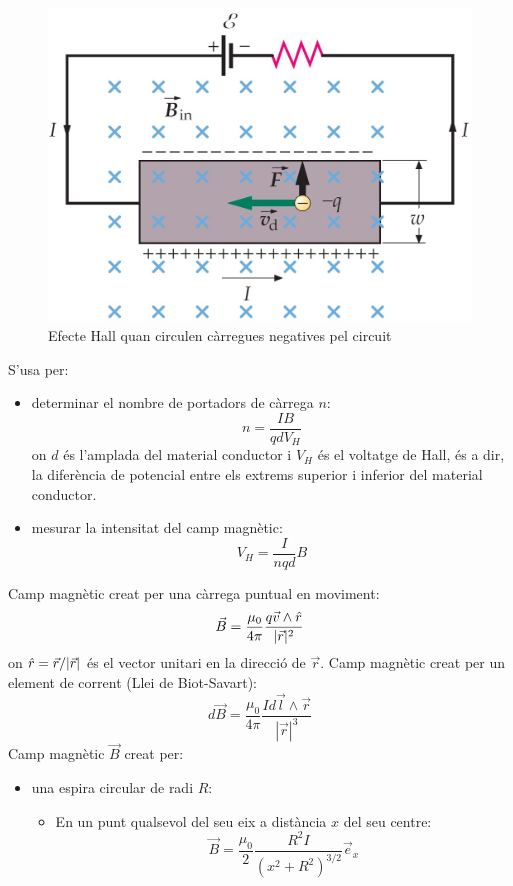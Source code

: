 \documentclass[class=article,10pt,crop=false]{standalone}
\begin{document}
\begin{multicols}{2}
\begin{figure}[ht]
\end{figure}
\begin{figure}[ht]
    \centering
    \includegraphics[width=\linewidth]{Physics/1st/Electricitat_i_magnetisme/Imatges/hall-.jpg} 
    \caption{Efecte Hall quan circulen càrregues negatives pel circuit}   
\end{figure}
S'usa per:
\begin{itemize}
    \item determinar el nombre de portadors de càrrega $n$: $$n=\frac{IB}{qdV_H}$$ {on $d$ és l'amplada del material conductor i $V_H$ és el voltatge de Hall, és a dir, la di\-fe\-rèn\-ci\-a de potencial entre els extrems superior i inferior del material conductor.}
    \item mesurar la intensitat del camp mag\-nè\-tic: $$V_H=\frac{I}{nqd}B$$
\end{itemize}
Camp magnètic creat per una càrrega puntual en moviment: $$\Vec{B}=\frac{\mu_0}{4\pi}\frac{q\Vec{v}\wedge\Hat{r}}{|\Vec{r}|^2}$$ {on $\Hat{r}=\Vec{r}/|\Vec{r}|$ és el vector unitari en la direcció de $\Vec{r}$.}\newline
Camp magnètic creat per un element de corrent (Llei de Biot-Savart): $$d\Vec{B}=\frac{\mu_0}{4\pi}\frac{Id\Vec{l}\wedge\Vec{r}}{|\Vec{r}|^3}$$
Camp magnètic $\Vec{B}$ creat per:
\begin{itemize}
    \item una espira circular de radi $R$:
    \begin{itemize}
        \item En un punt qualsevol del seu eix a distància $x$ del seu centre: $$\Vec{B}=\frac{\mu_0}{2}\frac{R^2I}{(x^2+R^2)^{3/2}}\Vec{e}_x$$

\end{itemize}
\end{itemize}
\end{multicols}
\end{document}

